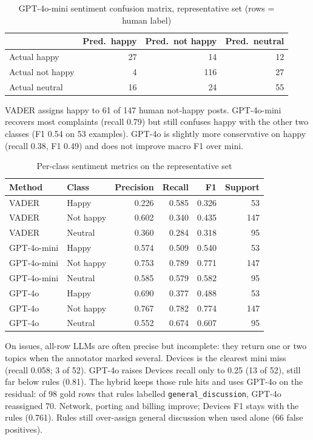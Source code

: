 \documentclass[11pt,a4paper]{article}
\begin{document}
\begin{table}[H]
\centering
\caption{GPT-4o-mini sentiment confusion matrix, representative set (rows = human label)}
\label{tab:cmllm}
\begin{tabular}{lrrr}
\toprule
 & \textbf{Pred.\ happy} & \textbf{Pred.\ not happy} & \textbf{Pred.\ neutral} \\
\midrule
Actual happy & 27 & 14 & 12 \\
Actual not happy & 4 & 116 & 27 \\
Actual neutral & 16 & 24 & 55 \\
\bottomrule
\end{tabular}
\end{table}

VADER assigns happy to 61 of 147 human not-happy posts. GPT-4o-mini recovers most complaints (recall 0.79) but still confuses happy with the other two classes (F1 0.54 on 53 examples). GPT-4o is slightly more conservative on happy (recall 0.38, F1 0.49) and does not improve macro F1 over mini.

\begin{table}[H]
\centering
\caption{Per-class sentiment metrics on the representative set}
\label{tab:sentclass}
\begin{tabular}{llrrrr}
\toprule
\textbf{Method} & \textbf{Class} & \textbf{Precision} & \textbf{Recall} & \textbf{F1} & \textbf{Support} \\
\midrule
VADER & Happy & 0.226 & 0.585 & 0.326 & 53 \\
VADER & Not happy & 0.602 & 0.340 & 0.435 & 147 \\
VADER & Neutral & 0.360 & 0.284 & 0.318 & 95 \\
GPT-4o-mini & Happy & 0.574 & 0.509 & 0.540 & 53 \\
GPT-4o-mini & Not happy & 0.753 & 0.789 & 0.771 & 147 \\
GPT-4o-mini & Neutral & 0.585 & 0.579 & 0.582 & 95 \\
GPT-4o & Happy & 0.690 & 0.377 & 0.488 & 53 \\
GPT-4o & Not happy & 0.767 & 0.782 & 0.774 & 147 \\
GPT-4o & Neutral & 0.552 & 0.674 & 0.607 & 95 \\
\bottomrule
\end{tabular}
\end{table}

On issues, all-row LLMs are often precise but incomplete: they return one or two topics when the annotator marked several. Devices is the clearest mini miss (recall 0.058; 3 of 52). GPT-4o raises Devices recall only to 0.25 (13 of 52), still far below rules (0.81). The hybrid keeps those rule hits and uses GPT-4o on the residual: of 98 gold rows that rules labelled \texttt{general\_discussion}, GPT-4o reassigned 70. Network, porting and billing improve; Devices F1 stays with the rules (0.761). Rules still over-assign general discussion when used alone (66 false positives).
\end{document}
